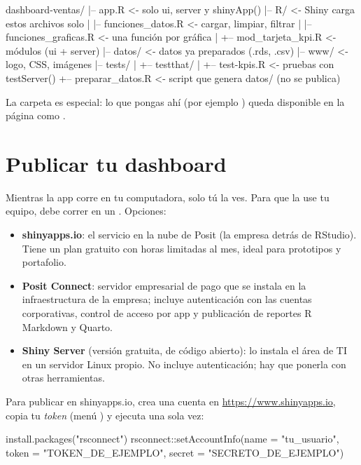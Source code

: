 \begin{textocodigo}
dashboard-ventas/
|-- app.R                    <- solo ui, server y shinyApp()
|-- R/                       <- Shiny carga estos archivos solo
|   |-- funciones_datos.R    <- cargar, limpiar, filtrar
|   |-- funciones_graficas.R <- una función por gráfica
|   +-- mod_tarjeta_kpi.R    <- módulos (ui + server)
|-- datos/                   <- datos ya preparados (.rds, .csv)
|-- www/                     <- logo, CSS, imágenes
|-- tests/
|   +-- testthat/
|       +-- test-kpis.R      <- pruebas con testServer()
+-- preparar_datos.R         <- script que genera datos/ (no se publica)
\end{textocodigo}

La carpeta  es especial: lo que pongas ahí (por ejemplo
) queda disponible en la página como
.

\section{Publicar tu dashboard}
\label{sec:m6-publicar}

Mientras la app corre en tu computadora, solo tú la ves. Para que la use tu
equipo, debe correr en un . Opciones:

\begin{itemize}
  \item \textbf{shinyapps.io}: el servicio en la nube de Posit (la empresa
        detrás de RStudio). Tiene un plan gratuito con horas limitadas al
        mes, ideal para prototipos y portafolio.
  \item \textbf{Posit Connect}: servidor empresarial de pago que se instala
        en la infraestructura de la empresa; incluye autenticación con las
        cuentas corporativas, control de acceso por app y publicación de
        reportes R Markdown y Quarto.
  \item \textbf{Shiny Server} (versión gratuita, de código abierto): lo
        instala el área de TI en un servidor Linux propio. No incluye
        autenticación; hay que ponerla con otras herramientas.
\end{itemize}

Para publicar en shinyapps.io, crea una cuenta en
\url{https://www.shinyapps.io}, copia tu \emph{token} (menú
) y ejecuta una sola vez:

\begin{rnoejecutar}
install.packages("rsconnect")
rsconnect::setAccountInfo(name   = "tu_usuario",
                          token  = "TOKEN_DE_EJEMPLO",
                          secret = "SECRETO_DE_EJEMPLO")
\end{rnoejecutar}

